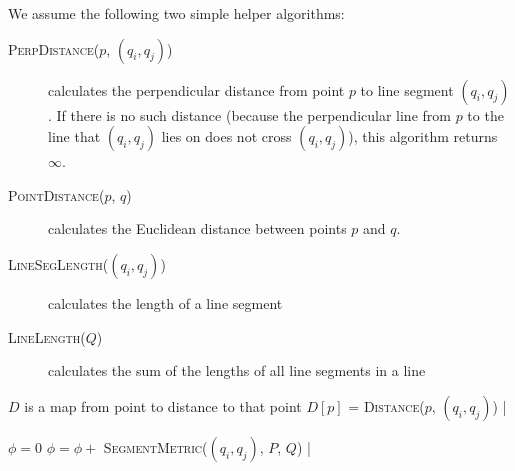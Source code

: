 We assume the following two simple helper algorithms:

\begin{description}
	\item[\textsc{PerpDistance}($p$, $(q_i, q_j)$)] calculates the perpendicular distance from point $p$ to line segment $(q_i, q_j)$.
		If there is no such distance (because the perpendicular line from $p$ to the line that $(q_i, q_j)$ lies on does not cross $(q_i, q_j)$), this algorithm returns $\infty$.
	\item[\textsc{PointDistance}($p$, $q$)] calculates the Euclidean distance between points $p$ and $q$.
	\item[\textsc{LineSegLength}($(q_i, q_j)$)] calculates the length of a line segment
	\item[\textsc{LineLength}($Q$)] calculates the sum of the lengths of all line segments in a line
\end{description}

\begin{sourcecode}
\qend

$D$ is a map from point to distance to that point
	$D[p]$ = \textsc{Distance}($p$, $(q_i, q_j)$)
|
\qend

$\phi = 0$
	$\phi = \phi + $ \textsc{SegmentMetric}($(q_i, q_j)$, $P$, $Q$)
|
\return{\phi}
\qend
\end{sourcecode}
